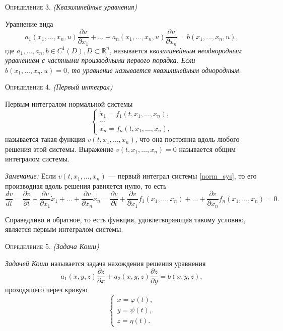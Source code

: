 \textsc{Определение 3.} \textit{(Квазилинейные уравнения)}

Уравнение вида 
\begin{equation}
	a_1(x_1, \dotsc, x_n, u) \frac{\partial u}{\partial x_1} + \dotsc + a_n(x_1, \dotsc, x_n, u) \frac{\partial u}{\partial x_n} = b(x_1, \dotsc, x_n, u),
\end{equation}
где $ a_1, \dotsc, a_n, b \in C^1(D), D \subset \mathbb{R}^{n}$, называется \textit{квазилинейным неоднородным уравнением с частными производными первого порядка. Если $ b(x_1, \dotsc, x_n, u) = 0$, то уравнение называется квазилинейным однородным.} 

\textsc{Определение 4.} \textit{(Первый интеграл)}

Первым интегралом нормальной системы
\begin{equation} \label{norm_sys}
	\begin{cases}
		\dot{x}_1 = f_1(t, x_1, \dotsc, x_n), \\
		\dotsc \\
		\dot{x}_n = f_n(t, x_1, \dotsc, x_n),
	\end{cases}
\end{equation} 
называется такая функция $ v(t, x_1, \dotsc, x_n)$, что она постоянна вдоль любого решения этой системы. Выражение $ v(t, x_1, \dotsc, x_n) = 0$ называется общим интегралом системы. 

\textit{Замечание:} Если $ v(t, x_1, \dotsc, x_n) $ --- первый интеграл системы \eqref{norm_sys}, то его производная вдоль решения равняется нулю, то есть 
\begin{equation*}
	\frac{d v}{d t} = \frac{\partial v}{\partial t} + \frac{\partial v}{\partial x_1} \dot{x}_1 + \dotsc + \frac{\partial v}{\partial x_n} \dot{x}_n = \frac{\partial v}{\partial t} + \frac{\partial v}{\partial x_1} f_1(x_1, \dotsc, x_n) + \dotsc + \frac{\partial v}{\partial x_n} f_n(x_1, \dotsc, x_n) = 0.
\end{equation*}

Справедливо и обратное, то есть функция, удовлетворяющая такому условию, является первым интегралом системы.

\textsc{Определение 5.} \textit{(Задача Коши)}

\textit{Задачей Коши} называется задача нахождения решения уравнения 
\begin{equation*}
	a_1(x, y, z) \frac{\partial z}{\partial x} + a_2(x, y, z) \frac{\partial z}{\partial y} = b(x, y, z),
\end{equation*}
проходящего через кривую
\begin{equation*}
	\begin{cases}
		x = \varphi(t), \\
		y = \psi(t), \\
		z = \eta(t).
	\end{cases}
\end{equation*}